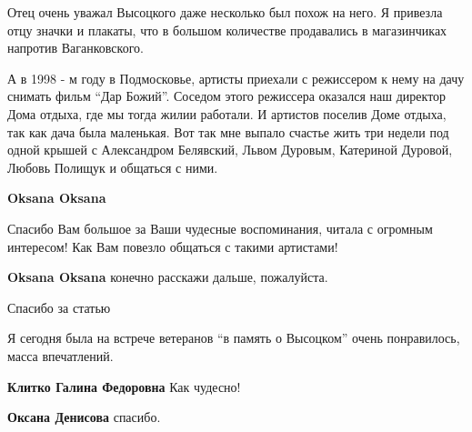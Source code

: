 \begin{itemize}
\begin{itemize}

Отец очень уважал Высоцкого даже несколько был похож на него. Я привезла отцу
значки и плакаты, что в большом количестве продавались в магазинчиках напротив
Ваганковского.


А в 1998 - м году в Подмосковье, артисты приехали с режиссером к нему на дачу
снимать фильм \enquote{Дар Божий}. Соседом этого режиссера оказался наш директор Дома
отдыха, где мы тогда жилии работали. И артистов поселив Доме отдыха, так как
дача была маленькая. Вот так мне выпало счастье жить три недели под одной крышей
с Александром Белявский, Львом Дуровым, Катериной Дуровой, Любовь Полищук и
общаться с ними.

\textbf{Oksana Oksana} 

Спасибо Вам большое за Ваши чудесные воспоминания, читала с огромным интересом!
Как Вам повезло общаться с такими артистами!

\textbf{Oksana Oksana} конечно расскажи дальше, пожалуйста.
\end{itemize} %

Спасибо за статью


Я сегодня была на встрече ветеранов \enquote{в память о Высоцком} очень
понравилось, масса впечатлений.

\begin{itemize} %
\textbf{Клитко Галина Федоровна} Как чудесно!

\textbf{Оксана Денисова} спасибо.
\end{itemize} %


\end{itemize} %

